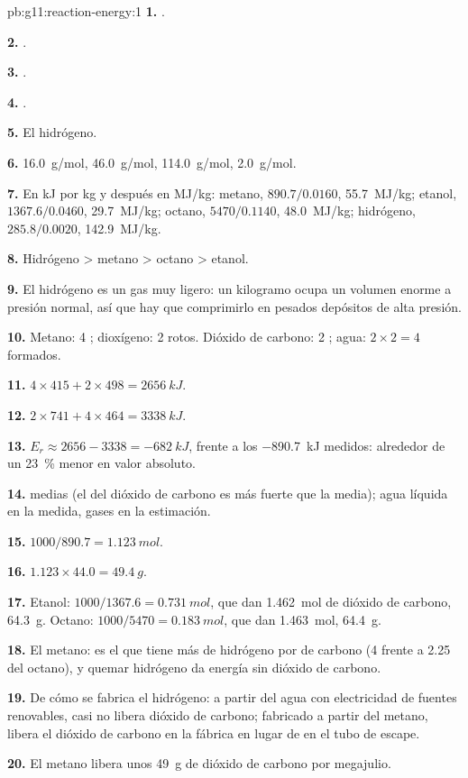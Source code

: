 \begin{solution}{pb:g11:reaction-energy:1}
\textbf{1.} .

\textbf{2.} .

\textbf{3.} .

\textbf{4.} .

\textbf{5.} El hidrógeno.

\textbf{6.} \qty{16.0}{g/mol}, \qty{46.0}{g/mol}, \qty{114.0}{g/mol},
\qty{2.0}{g/mol}.

\textbf{7.} En \si{kJ} por \si{kg} y después en \si{MJ/kg}: metano,
$890.7 / 0.0160$, \qty{55.7}{MJ/kg}; etanol, $1367.6 / 0.0460$,
\qty{29.7}{MJ/kg}; octano, $5470 / 0.1140$, \qty{48.0}{MJ/kg};
hidrógeno, $285.8 / 0.0020$, \qty{142.9}{MJ/kg}.

\textbf{8.} Hidrógeno > metano > octano > etanol.

\textbf{9.} El hidrógeno es un gas muy ligero: un kilogramo ocupa un
volumen enorme a presión normal, así que hay que comprimirlo en pesados
depósitos de alta presión.

\textbf{10.} Metano: 4 ; dioxígeno: 2  rotos. Dióxido de
carbono: 2 ; agua: $2 \times 2 = 4$  formados.

\textbf{11.} $4 \times 415 + 2 \times 498 = \qty{2656}{kJ}$.

\textbf{12.} $2 \times 741 + 4 \times 464 = \qty{3338}{kJ}$.

\textbf{13.} $E_r \approx 2656 - 3338 = \qty{-682}{kJ}$, frente a los
\qty{-890.7}{kJ} medidos: alrededor de un \qty{23}{\percent} menor en
valor absoluto.

\textbf{14.}  medias (el  del dióxido de
carbono es más fuerte que la media); agua líquida en la medida, gases en
la estimación.

\textbf{15.} $1000 / 890.7 = \qty{1.123}{mol}$.

\textbf{16.} $1.123 \times 44.0 = \qty{49.4}{g}$.

\textbf{17.} Etanol: $1000 / 1367.6 = \qty{0.731}{mol}$, que dan
\qty{1.462}{mol} de dióxido de carbono, \qty{64.3}{g}. Octano:
$1000 / 5470 = \qty{0.183}{mol}$, que dan \qty{1.463}{mol},
\qty{64.4}{g}.

\textbf{18.} El metano: es el que tiene más  de hidrógeno por
 de carbono (4 frente a 2.25 del octano), y quemar hidrógeno da
energía sin dióxido de carbono.

\textbf{19.} De cómo se fabrica el hidrógeno: a partir del agua con
electricidad de fuentes renovables, casi no libera dióxido de carbono;
fabricado a partir del metano, libera el dióxido de carbono en la
fábrica en lugar de en el tubo de escape.

\textbf{20.} El metano libera unos \qty{49}{g} de dióxido de carbono por
megajulio.
\end{solution}
